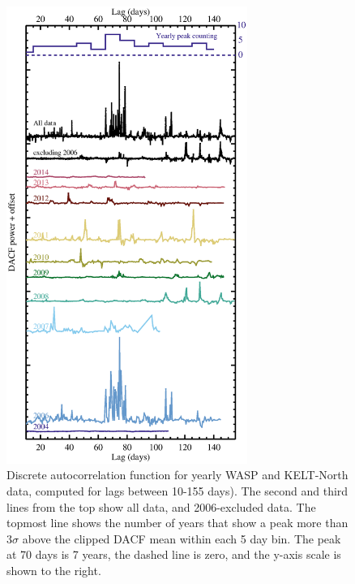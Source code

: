 \documentclass[]{rsos}
\begin{document}
\begin{figure}
\begin{center}
\hspace{-0.5cm} \includegraphics[width=0.7\textwidth]{figs/auto.eps}
\caption{Discrete autocorrelation function for yearly WASP and KELT-North data, computed
  for lags between 10-155 days). The second and third lines from the top show all data,
  and 2006-excluded data. The topmost line shows the number of years that show a peak
  more than 3$\sigma$ above the clipped DACF mean within each 5 day bin. The peak at 70
  days is 7 years, the dashed line is zero, and the y-axis scale is shown to the
  right.}\label{fig:auto}
\end{center}
\end{figure}
\end{document}
